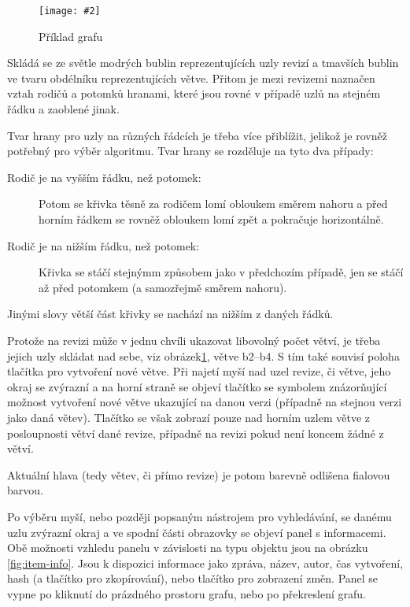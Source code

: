 \documentclass[
  biblatex,
  glossaries,
  index
]{kidiplom}
\newcommand{\pic}[4]{
\begin{figure}[h]
\centering
\texttt{[image: \#2]}
\caption{#3}
\label{fig:#4}
\end{figure}}
\begin{document}
\pic{10cm}{graph.png}{Příklad grafu}{graph}

Skládá se ze světle modrých bublin reprezentujících uzly revizí a tmavších bublin ve tvaru obdélníku reprezentujících větve. Přitom je mezi revizemi naznačen vztah rodičů a potomků hranami, které jsou rovné v případě uzlů na stejném řádku a zaoblené jinak.

Tvar hrany pro uzly na různých řádcích je třeba více přiblížit, jelikož je rovněž potřebný pro výběr algoritmu. Tvar hrany se rozděluje na tyto dva případy:
\begin{description}
\item[Rodič je na vyšším řádku, než potomek:]
Potom se křivka těsně za rodičem lomí obloukem směrem nahoru a před horním řádkem se rovněž obloukem lomí zpět a pokračuje horizontálně.
\item[Rodič je na nižším řádku, než potomek:]
Křivka se stáčí stejnýmm způsobem jako v předchozím případě, jen se stáčí až před potomkem (a samozřejmě směrem nahoru).
\end{description}
Jinými slovy větší část křivky se nachází na nižším z daných řádků.

Protože na revizi může v jednu chvíli ukazovat libovolný počet větví, je třeba jejich uzly skládat nad sebe, viz obrázek\ref{fig:graph}, větve b2--b4. S tím také souvisí poloha tlačítka pro vytvoření nové větve. Při najetí myší nad uzel revize, či větve, jeho okraj se zvýrazní a na horní straně se objeví tlačítko se symbolem \uv{+} znázorňující možnost vytvoření nové větve ukazující na danou verzi (případně na stejnou verzi jako daná větev). Tlačítko se však zobrazí pouze nad horním uzlem větve z posloupnosti větví dané revize, případně na revizi pokud není koncem žádné z větví.

Aktuální hlava (tedy větev, či přímo revize) je potom barevně odlišena fialovou barvou.

Po výběru myší, nebo později popsaným nástrojem pro vyhledávání, se danému uzlu zvýrazní okraj a ve spodní části obrazovky se objeví panel s informacemi. Obě možnosti vzhledu panelu v závislosti na typu objektu jsou na obrázku \ref{fig:item-info}. Jsou k dispozici informace jako zpráva, název, autor, čas vytvoření, hash (a tlačítko pro zkopírování), nebo tlačítko pro zobrazení změn. Panel se vypne po kliknutí do prázdného prostoru grafu, nebo po překreslení grafu.
\end{document}
